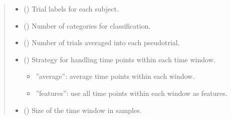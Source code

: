 \documentclass[letterpaper,10pt,english]{sphinxhowto}
\begin{document}
\begin{fulllineitems}
\begin{quote}
\begin{description}
\begin{itemize}
\item {} 
\sphinxAtStartPar
{} (\sphinxstyleliteralemphasis{\sphinxupquote{, }}\sphinxstyleliteralemphasis{\sphinxupquote{ {[}}}\sphinxstyleliteralemphasis{\sphinxupquote{, }}\sphinxstyleliteralemphasis{\sphinxupquote{{]}}}) \textendash{} Trial labels for each subject.

\item {} 
\sphinxAtStartPar
{} (\sphinxstyleliteralemphasis{\sphinxupquote{, }}) \textendash{} Number of categories for classification.

\item {} 
\sphinxAtStartPar
{} (\sphinxstyleliteralemphasis{\sphinxupquote{, }}) \textendash{} Number of trials averaged into each pseudo\sphinxhyphen{}trial.

\item {} 
\sphinxAtStartPar
{} (\sphinxstyleliteralemphasis{\sphinxupquote{, }}\sphinxstyleliteralemphasis{\sphinxupquote{, }}) \textendash{} 
\sphinxAtStartPar
Strategy for handling time points within each time window.
\begin{itemize}
\item {} 
\sphinxAtStartPar
”average”: average time points within each window.

\item {} 
\sphinxAtStartPar
”features”: use all time points within each window as features.

\end{itemize}


\item {} 
\sphinxAtStartPar
{} (\sphinxstyleliteralemphasis{\sphinxupquote{, }}) \textendash{} Size of the time window in samples.


\end{itemize}
\end{description}
\end{quote}
\end{fulllineitems}
\end{document}
